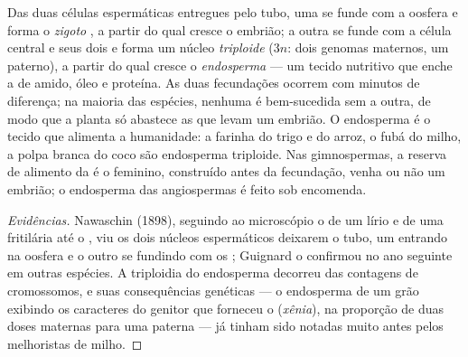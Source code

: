 \begin{proposition}\label{prop:b2:angiosperm-reproduction:double}
Das duas células espermáticas entregues pelo tubo, uma se funde com a
oosfera e forma o \emph{zigoto} , a partir do qual cresce o
embrião; a outra se funde com a célula central e seus dois  e forma um núcleo \emph{triploide} ($3n$: dois genomas maternos,
um paterno), a partir do qual cresce o \emph{endosperma} --- um tecido
nutritivo que enche a  de amido, óleo e proteína. As duas
fecundações ocorrem com minutos de diferença; na maioria das espécies,
nenhuma é bem-sucedida sem a outra, de modo que a planta só abastece as
 que levam um embrião. O endosperma é o tecido que alimenta a
humanidade: a farinha do trigo e do arroz, o fubá do milho, a polpa
branca do coco são endosperma triploide. Nas gimnospermas, a reserva
de alimento da  é o  feminino, construído antes da
fecundação, venha ou não um embrião; o endosperma das angiospermas é
feito sob encomenda.
\end{proposition}
\begin{proof}[Evidências]
Nawaschin (1898), seguindo ao microscópio o  de um lírio
e de uma fritilária até o , viu os dois núcleos
espermáticos deixarem o tubo, um entrando na oosfera e o outro se
fundindo com os ; Guignard o confirmou no ano seguinte
em outras espécies. A triploidia do endosperma decorreu das contagens
de cromossomos, e suas consequências genéticas --- o endosperma de um
grão exibindo os caracteres do genitor que forneceu o 
(\emph{xênia}), na proporção de duas doses maternas para uma paterna
--- já tinham sido notadas muito antes pelos melhoristas de milho.
\end{proof}

